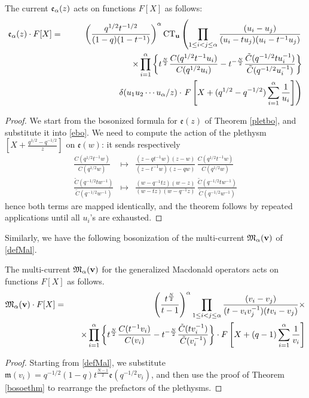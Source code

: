 \begin{thm}\label{bosoethm}
The current ${\mathfrak e}_{{\alpha}}(z)$ acts on functions $F[X]$ as follows:
\begin{eqnarray*}
{\mathfrak e}_{{\alpha}}(z)\cdot F[X]&=& \left(\frac{q^{1/2}t^{-1/2}}{(1-q)(1-t^{-1})}\right)^{\alpha}
{\rm CT}_{\mathbf u}\left(\prod_{1\leq i<j\leq {\alpha}} \frac{(u_i-u_j)}{(u_i-t u_j)(u_i-t^{-1}u_j)} \right. \\
&&\quad  \times \prod_{i=1}^{\alpha} \left\{ t^{\frac{N}{2}} \frac{C(q^{1/2}t^{-1}u_i)}{C(q^{1/2} u_i)} 
-t^{-\frac{N}{2}} \frac{{\tilde C}(q^{-1/2}t u_i^{-1})}{{\tilde C}(q^{-1/2} u_i^{-1})} \right\} \\
&&\qquad \qquad \qquad \delta(u_1u_2 \cdots u_{\alpha}/z)\cdot \left.
F\left[X+(q^{1/2}-q^{-1/2})\sum_{i=1}^{\alpha} \frac{1}{u_i} \right]\right)
\end{eqnarray*}
\end{thm}
\begin{proof}
We start from the bosonized formula for ${\mathfrak e}(z)$ of Theorem \ref{pletbo}, and substitute it into
\eqref{ebo}. We need to compute the action of the plethysm $[X+\frac{q^{1/2}-q^{-1/2}}{z}]$ on ${\mathfrak e}(w)$:
it sends respectively
\begin{eqnarray*}
\frac{C(q^{1/2}t^{-1}w)}{C(q^{1/2}w)}&\mapsto& \frac{(z-q t^{-1} w)(z-w)}{(z-t^{-1}w)(z-q w)} 
\,\frac{C(q^{1/2}t^{-1}w)}{C(q^{1/2}w)}\\
\frac{{\tilde C}(q^{-1/2}t w^{-1})}{{\tilde C}(q^{-1/2}w^{-1})}&\mapsto& \frac{(w-q^{-1} t z)(w-z)}{(w-t z)(w-q^{-1} z)} 
\, \frac{{\tilde C}(q^{-1/2}t w^{-1})}{{\tilde C}(q^{-1/2}w^{-1})}
\end{eqnarray*}
hence both terms are mapped identically, and the theorem follows by repeated applications until all $u_i$'s are
exhausted.
\end{proof}

Similarly, we have the following bosonization of the multi-current ${\mathfrak M}_{\alpha}({\mathbf v})$ of \eqref{defMal}.
\begin{thm}
The multi-current ${\mathfrak M}_{\alpha}({\mathbf v})$  for the generalized Macdonald operators acts on functions $F[X]$ as follows.
\begin{eqnarray*}
{\mathfrak M}_{\alpha}({\mathbf v})\cdot F[X]&=&\left(\frac{t^{\frac{N}{2}}}{t-1}\right)^{\alpha}
\prod_{1\leq i<j\leq {\alpha}} \frac{(v_i-v_j)}{(t -v_i v_j^{-1})(t v_i-v_j)}\times \\
&&\quad \times\prod_{i=1}^{\alpha} \left\{t^{\frac{N}{2}} \frac{C(t^{-1}v_i)}{C(v_i)} 
-t^{-\frac{N}{2}} \frac{{\tilde C}(t v_i^{-1})}{{\tilde C}(v_i^{-1})} \right\} \cdot  F\left[X+(q-1)\sum_{i=1}^{\alpha} \frac{1}{v_i} \right]
\end{eqnarray*}
\end{thm}
\begin{proof}
Starting from \eqref{defMal}, we substitute ${\mathfrak m}(v_i)= q^{-1/2}(1-q)t^{\frac{N-1}{2}}{\mathfrak e}(q^{-1/2}v_i)$,
and then use the proof of Theorem \ref{bosoethm} to rearrange the prefactors of the plethysms.
\end{proof}

